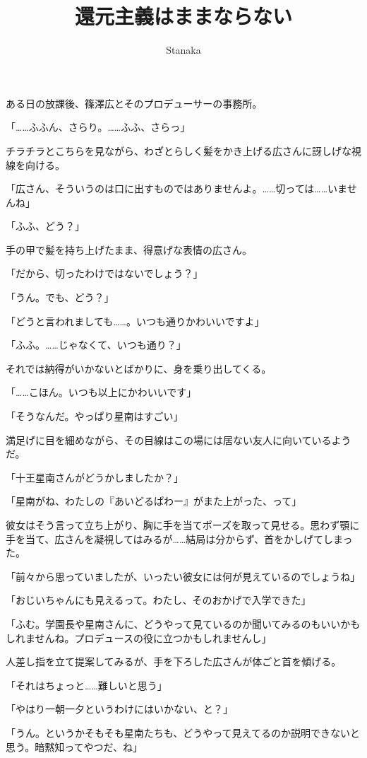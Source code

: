 \documentclass[paper=b5j]{jlreq}
\title{還元主義はままならない}
\author{Stanaka}
\begin{document}
\maketitle
\setlength{\parskip}{0.3\baselineskip}


ある日の放課後、篠澤広とそのプロデューサーの事務所。

「……ふふん、さらり。……ふふ、さらっ」

チラチラとこちらを見ながら、わざとらしく髪をかき上げる広さんに訝しげな視線を向ける。

「広さん、そういうのは口に出すものではありませんよ。……切っては……いませんね」

「ふふ、どう？」

手の甲で髪を持ち上げたまま、得意げな表情の広さん。


「だから、切ったわけではないでしょう？」

「うん。でも、どう？」    

「どうと言われましても……。いつも通りかわいいですよ」

「ふふ。……じゃなくて、いつも通り？」

それでは納得がいかないとばかりに、身を乗り出してくる。

「……こほん。いつも以上にかわいいです」

「そうなんだ。やっぱり星南はすごい」

満足げに目を細めながら、その目線はこの場には居ない友人に向いているようだ。

「十王星南さんがどうかしましたか？」

「星南がね、わたしの『あいどるぱわー』がまた上がった、って」

彼女はそう言って立ち上がり、胸に手を当てポーズを取って見せる。思わず顎に手を当て、広さんを凝視してはみるが……結局は分からず、首をかしげてしまった。

「前々から思っていましたが、いったい彼女には何が見えているのでしょうね」

「おじいちゃんにも見えるって。わたし、そのおかげで入学できた」

「ふむ。学園長や星南さんに、どうやって見ているのか聞いてみるのもいいかもしれませんね。プロデュースの役に立つかもしれませんし」

人差し指を立て提案してみるが、手を下ろした広さんが体ごと首を傾げる。

「それはちょっと……難しいと思う」

「やはり一朝一夕というわけにはいかない、と？」

「うん。というかそもそも星南たちも、どうやって見えてるのか説明できないと思う。暗黙知ってやつだ、ね」
\end{document}
